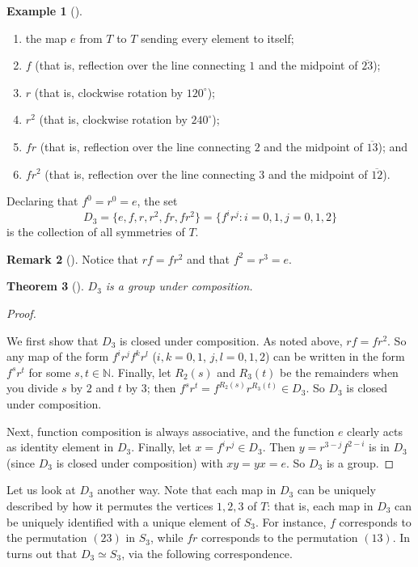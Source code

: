 \documentclass[10pt,]{book}
\theoremstyle{plain}
\newtheorem{theorem}{Theorem}[section]
\theoremstyle{definition}
\theoremstyle{definition}
\newtheorem{remark}[theorem]{Remark}
\theoremstyle{definition}
\newtheorem{example}[theorem]{Example}
\theoremstyle{definition}
\numberwithin{equation}{section}
\def\N{\mathbb{N}}
\begin{document}
\begin{example}[]
\begin{enumerate}
\item\hypertarget{li-346}{}the map \(e\) from \(T\) to \(T\) sending every element to itself;%
\item\hypertarget{li-347}{}\(f\) (that is, reflection over the line connecting \(1\) and the midpoint of \(\overline{23}\));%
\item\hypertarget{li-348}{}\(r\) (that is, clockwise rotation by \(120^{\circ}\));%
\item\hypertarget{li-349}{}\(r^2\) (that is, clockwise rotation by \(240^{\circ}\));%
\item\hypertarget{li-350}{}\(fr\) (that is, reflection over the line connecting \(2\) and the midpoint of \(\overline{13}\)); and%
\item\hypertarget{li-351}{}\(fr^2\) (that is, reflection over the line connecting \(3\) and the midpoint of \(\overline{12}\)).%
\end{enumerate}
%
\par
Declaring that \(f^0=r^0=e\), the set%
\begin{equation*}
D_3=\{e, f, r, r^2, fr, fr^2\}=\{f^ir^j:i=0,1, j=0,1,2\}
\end{equation*}
is the collection of all symmetries of \(T\).%
\end{example}
\begin{remark}[]\label{remark-31}
Notice that \(rf=fr^2\) and that \(f^2=r^3=e\).%
\end{remark}
\begin{theorem}[{}]\label{di3}
\(D_3\) is a group under composition.%
\end{theorem}
\begin{proof}\hypertarget{proof-31}{}
We first show that \(D_3\) is closed under composition. As noted above, \(rf=fr^2\). So any map of the form \(f^ir^jf^kr^l\) (\(i,k=0,1\), \(j,l=0,1,2\)) can be written in the form \(f^sr^t\) for some \(s,t \in \N\). Finally, let \(R_2(s)\) and \(R_3(t)\) be the remainders when you divide \(s\) by \(2\) and \(t\) by \(3\); then \(f^sr^t=f^{R_2(s)}r^{R_3(t)} \in D_3\). So \(D_3\) is closed under composition.%
\par
Next, function composition is always associative, and the function \(e\) clearly acts as identity element in \(D_3\). Finally, let \(x=f^ir^j\in D_3\). Then \(y=r^{3-j}f^{2-i}\) is in \(D_3\) (since \(D_3\) is closed under composition) with \(xy=yx=e\). So \(D_3\) is a group.%
\end{proof}
Let us look at \(D_3\) another way. Note that each map in \(D_3\) can be uniquely described by how it permutes the vertices \(1,2,3\) of \(T\): that is, each map in \(D_3\) can be uniquely identified with a unique element of \(S_3\). For instance, \(f\) corresponds to the permutation \((23)\) in \(S_3\), while \(fr\) corresponds to the permutation \((13)\). In turns out that \(D_3 \simeq S_3\), via the following correspondence.%
\end{document}

